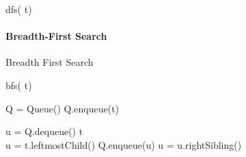 \documentclass[../../notes.tex]{subfiles}
\begin{document}
  \begin{algorithm}[H]
    \NoCaptionOfAlgo
    \caption{dfs( t)}

  \end{algorithm}

  \paragraph{Breadth-First Search} Breadth First Search

  \begin{algorithm}[H]
    \NoCaptionOfAlgo
    \caption{bfs( t)}

     Q = Queue()
    Q.enqueue(t)

     {
       u = Q.dequeue()
       t\\
      u = t.leftmostChild()
       {
          Q.enqueue(u)
          u = u.rightSibling()
        }
      }
  \end{algorithm}
\end{document}
